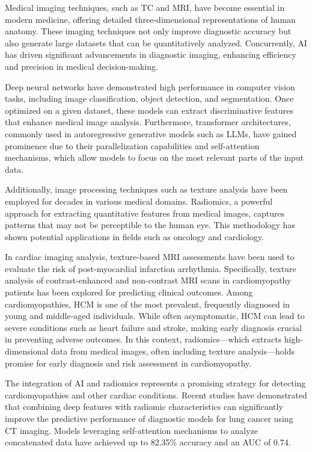 \documentclass[journal,twoside,web]{ieeecolor}
\begin{document}
Medical imaging techniques, such as \gls{TC} and \gls{MRI}, have become essential in modern medicine, offering detailed three-dimensional representations of human anatomy. These imaging techniques not only improve diagnostic accuracy but also generate large datasets that can be quantitatively analyzed. Concurrently, \gls{AI} has driven significant advancements in diagnostic imaging, enhancing efficiency and precision in medical decision-making.

Deep neural networks have demonstrated high performance in computer vision tasks, including image classification, object detection, and segmentation. Once optimized on a given dataset, these models can extract discriminative features that enhance medical image analysis. Furthermore, transformer architectures, commonly used in autoregressive generative models such as \gls{LLMs}, have gained prominence due to their parallelization capabilities and self-attention mechanisms, which allow models to focus on the most relevant parts of the input data.

Additionally, image processing techniques such as texture analysis have been employed for decades in various medical domains. Radiomics, a powerful approach for extracting quantitative features from medical images, captures patterns that may not be perceptible to the human eye. This methodology has shown potential applications in fields such as oncology and cardiology.

In cardiac imaging analysis, texture-based MRI assessments have been used to evaluate the risk of post-myocardial infarction arrhythmia. Specifically, texture analysis of contrast-enhanced and non-contrast MRI scans in cardiomyopathy patients has been explored for predicting clinical outcomes. Among cardiomyopathies, \gls{HCM} is one of the most prevalent, frequently diagnosed in young and middle-aged individuals. While often asymptomatic, \gls{HCM} can lead to severe conditions such as heart failure and stroke, making early diagnosis crucial in preventing adverse outcomes. In this context, radiomics—which extracts high-dimensional data from medical images, often including texture analysis—holds promise for early diagnosis and risk assessment in cardiomyopathy.

The integration of AI and radiomics represents a promising strategy for detecting cardiomyopathies and other cardiac conditions. Recent studies have demonstrated that combining deep features with radiomic characteristics can significantly improve the predictive performance of diagnostic models for lung cancer using CT imaging. Models leveraging self-attention mechanisms to analyze concatenated data have achieved up to 82.35\% accuracy and an AUC of 0.74.
\end{document}

